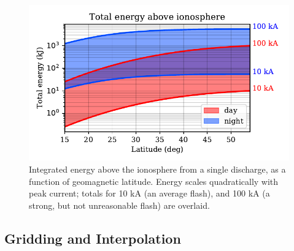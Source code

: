\begin{figure}
\begin{center}
\includegraphics{figures/total_energy.pdf}
\caption[Energy above the ionosphere due to a single flash]{Integrated energy above the ionosphere from a single discharge, as a function of geomagnetic latitude. Energy scales quadratically with peak current; totals for 10 kA (an average flash), and 100 kA (a strong, but not unreasonable flash) are overlaid. }
\label{fig:illumination}
\end{center}
\end{figure}


\subsection{Gridding and Interpolation}

